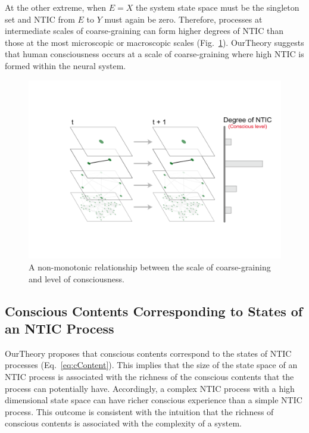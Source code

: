 \documentclass[utf8]{article}
\begin{document}
    		At the other extreme, when $E=X$ the system state space must be the singleton set and NTIC from $E$ to $Y$ must again be zero. Therefore, processes at intermediate scales of coarse-graining can form higher degrees of NTIC than those at the most microscopic or macroscopic scales (Fig.~\ref{fig:LevelOfConsciousness}). \ac{OurTheory} suggests that human consciousness occurs at a scale of coarse-graining where high NTIC is formed within the neural system. 
    		
    		\begin{figure}[H]				
        		\includegraphics[width=\textwidth]{Submission/Frontiers/nonMono.pdf}
        		\caption{A non-monotonic relationship between the scale of coarse-graining and level of consciousness.}
        		\label{fig:LevelOfConsciousness}
    		\end{figure}
            
    			
		\subsection{Conscious Contents Corresponding to States of an NTIC Process}\label{sec:cc}
    		\ac{OurTheory} proposes that conscious contents correspond to the states of NTIC processes (Eq.~\ref{eq:cContent}). This implies that the size of the state space of an NTIC process is associated with the richness of the conscious contents that the process can potentially have. Accordingly, a complex NTIC process with a high dimensional state space can have richer conscious experience than a simple NTIC process. This outcome is consistent with the intuition that the richness of conscious contents is associated with the complexity of a system. 
    		
\end{document}
